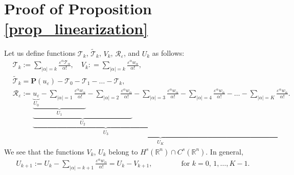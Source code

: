 \documentclass [oneside,11pt] {amsart}
\numberwithin{equation}{section}
\newcommand{\R}{\mathbb{R}}
\begin{document}
\appendix
\section{Proof of Proposition \ref{prop_linearization}}




Let us define functions $\mathcal{T}_k$,  $\widetilde{\mathcal{T}}_k$, $V_k$, $\mathcal{R}_\varepsilon$, and $U_k$ as follows:
\begin{align*}
&\mathcal{T} _k:= \sum_{|\alpha|=k} \frac{\varepsilon^\alpha \mathcal{T}_\alpha}{\alpha!} , \quad V_k : = \sum_{|\alpha|=k} \frac{\varepsilon^\alpha w_\alpha}{\alpha!},\\
& \widetilde{\mathcal{T}}_k = \mathbf{P}(u_\varepsilon) - \mathcal{T}_0- \mathcal{T}_1-\ldots - \mathcal{T}_k,\\
&\mathcal{R}_\varepsilon :=\underbrace{\underbrace{ \underbrace{\underbrace{\underbrace{u_\varepsilon}_{U_0} - \sum_{|\alpha|=1}  \frac{\varepsilon^\alpha w_\alpha}{\alpha!} }_{  U_1}
-
\sum_{|\alpha|=2}  \frac{\varepsilon^\alpha w_\alpha}{\alpha!}}_{ U_2}
- 
\sum_{|\alpha|=3}  \frac{\varepsilon^\alpha w_\alpha}{\alpha!}}_{U_3} - 
\sum_{|\alpha|=4}  \frac{\varepsilon^\alpha w_\alpha}{\alpha!}-\ldots - \sum_{|\alpha|=K}  \frac{\varepsilon^\alpha w_\alpha}{\alpha!}}_{U_K}.
\end{align*}
We see that the functions $V_k$, $U_k$ belong to $ H^s(\R^n)\cap C^s(\R^n)$. In general,
\begin{align}\label{DEF:Uk}
U_{k+1}:= U_{k}  
- \sum_{|\alpha|=k+1}  \frac{\varepsilon^\alpha w_\alpha}{\alpha!} = U_k-V_{k+1},\qquad\qquad \mbox{for } k=0,\,1,\ldots, K-1.
\end{align}
\end{document}

